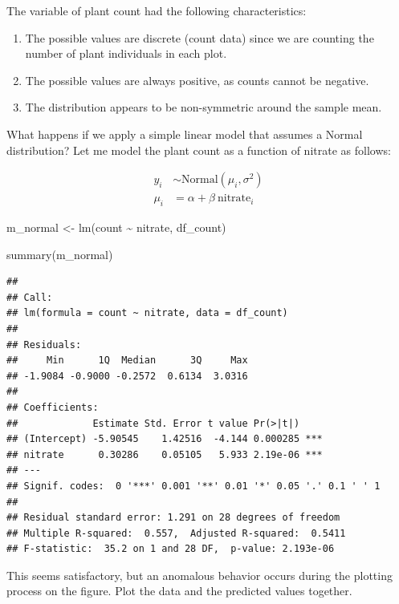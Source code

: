 \documentclass[
]{book}
\newenvironment{Shaded}{\begin{snugshade}}{\end{snugshade}}
\newcommand{\FunctionTok}[1]{\textcolor[rgb]{0.00,0.00,0.00}{#1}}
\newcommand{\NormalTok}[1]{#1}
\newcommand{\OtherTok}[1]{\textcolor[rgb]{0.56,0.35,0.01}{#1}}
\newcommand{\SpecialCharTok}[1]{\textcolor[rgb]{0.00,0.00,0.00}{#1}}
\begin{document}
The variable of plant count had the following characteristics:

\begin{enumerate}
\def\labelenumi{\arabic{enumi}.}
\item
  The possible values are discrete (count data) since we are counting the number of plant individuals in each plot.
\item
  The possible values are always positive, as counts cannot be negative.
\item
  The distribution appears to be non-symmetric around the sample mean.
\end{enumerate}

What happens if we apply a simple linear model that assumes a Normal distribution? Let me model the plant count as a function of nitrate as follows:

\[
\begin{aligned}
y_i &\sim \text{Normal}(\mu_i, \sigma^2)\\
\mu_i &= \alpha + \beta~\text{nitrate}_i
\end{aligned}
\]

\begin{Shaded}
\begin{Highlighting}[]
\NormalTok{m\_normal }\OtherTok{\textless{}{-}} \FunctionTok{lm}\NormalTok{(count }\SpecialCharTok{\textasciitilde{}}\NormalTok{ nitrate,}
\NormalTok{               df\_count)}

\FunctionTok{summary}\NormalTok{(m\_normal)}
\end{Highlighting}
\end{Shaded}

\begin{verbatim}
## 
## Call:
## lm(formula = count ~ nitrate, data = df_count)
## 
## Residuals:
##     Min      1Q  Median      3Q     Max 
## -1.9084 -0.9000 -0.2572  0.6134  3.0316 
## 
## Coefficients:
##             Estimate Std. Error t value Pr(>|t|)    
## (Intercept) -5.90545    1.42516  -4.144 0.000285 ***
## nitrate      0.30286    0.05105   5.933 2.19e-06 ***
## ---
## Signif. codes:  0 '***' 0.001 '**' 0.01 '*' 0.05 '.' 0.1 ' ' 1
## 
## Residual standard error: 1.291 on 28 degrees of freedom
## Multiple R-squared:  0.557,  Adjusted R-squared:  0.5411 
## F-statistic:  35.2 on 1 and 28 DF,  p-value: 2.193e-06
\end{verbatim}

This seems satisfactory, but an anomalous behavior occurs during the plotting process on the figure. Plot the data and the predicted values together.
\end{document}
